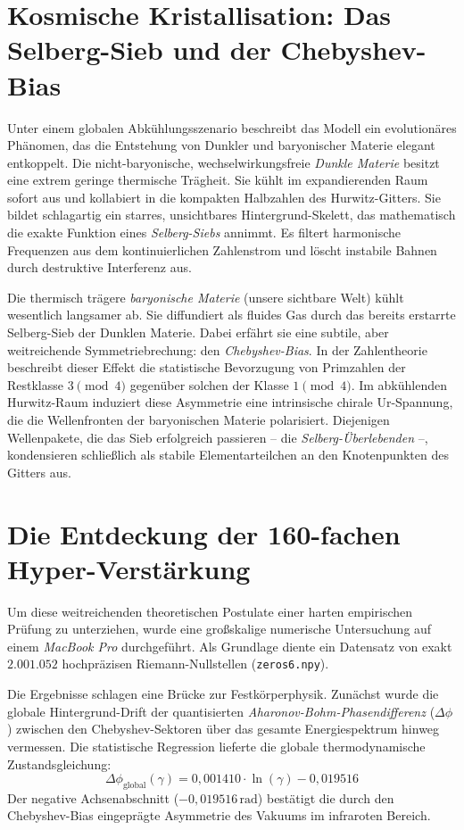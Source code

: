 \documentclass[11pt,a4paper]{article}
\begin{document}
	\section{Kosmische Kristallisation: Das Selberg-Sieb und der Chebyshev-Bias}
	Unter einem globalen Abkühlungsszenario beschreibt das Modell ein evolutionäres Phänomen, das die Entstehung von Dunkler und baryonischer Materie elegant entkoppelt. Die nicht-baryonische, wechselwirkungsfreie \textit{Dunkle Materie} besitzt eine extrem geringe thermische Trägheit. Sie kühlt im expandierenden Raum sofort aus und kollabiert in die kompakten Halbzahlen des Hurwitz-Gitters. Sie bildet schlagartig ein starres, unsichtbares Hintergrund-Skelett, das mathematisch die exakte Funktion eines \textit{Selberg-Siebs} annimmt. Es filtert harmonische Frequenzen aus dem kontinuierlichen Zahlenstrom und löscht instabile Bahnen durch destruktive Interferenz aus.
	
	Die thermisch trägere \textit{baryonische Materie} (unsere sichtbare Welt) kühlt wesentlich langsamer ab. Sie diffundiert als fluides Gas durch das bereits erstarrte Selberg-Sieb der Dunklen Materie. Dabei erfährt sie eine subtile, aber weitreichende Symmetriebrechung: den \textit{Chebyshev-Bias}. In der Zahlentheorie beschreibt dieser Effekt die statistische Bevorzugung von Primzahlen der Restklasse $3 \pmod 4$ gegenüber solchen der Klasse $1 \pmod 4$. Im abkühlenden Hurwitz-Raum induziert diese Asymmetrie eine intrinsische chirale Ur-Spannung, die die Wellenfronten der baryonischen Materie polarisiert. Diejenigen Wellenpakete, die das Sieb erfolgreich passieren – die \textit{Selberg-Überlebenden} –, kondensieren schließlich als stabile Elementarteilchen an den Knotenpunkten des Gitters aus.
	
	\section{Die Entdeckung der 160-fachen Hyper-Verstärkung}
	Um diese weitreichenden theoretischen Postulate einer harten empirischen Prüfung zu unterziehen, wurde eine großskalige numerische Untersuchung auf einem \textit{MacBook Pro} durchgeführt. Als Grundlage diente ein Datensatz von exakt $2.001.052$ hochpräzisen Riemann-Nullstellen (\texttt{zeros6.npy}).
	
	Die Ergebnisse schlagen eine Brücke zur Festkörperphysik. Zunächst wurde die globale Hintergrund-Drift der quantisierten \textit{Aharonov-Bohm-Phasendifferenz} ($\Delta\phi$) zwischen den Chebyshev-Sektoren über das gesamte Energiespektrum hinweg vermessen. Die statistische Regression lieferte die globale thermodynamische Zustandsgleichung:
	\begin{equation}
		\Delta\phi_{\text{global}}(\gamma) = 0,001410 \cdot \ln(\gamma) - 0,019516
	\end{equation}
	Der negative Achsenabschnitt ($-0,019516\,\text{rad}$) bestätigt die durch den Chebyshev-Bias eingeprägte Asymmetrie des Vakuums im infraroten Bereich. 
	
\end{document}
